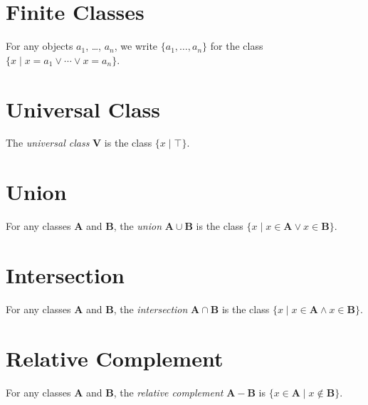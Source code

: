 \section{Finite Classes}

\begin{definition}
    For any objects $a_1$, \ldots, $a_n$, we write $\{ a_1, \ldots, a_n \}$
    for the class $\{ x \mid x = a_1 \vee \cdots \vee x = a_n \}$.
\end{definition}

\section{Universal Class}

\begin{definition}
    The \emph{universal class} $\mathbf{V}$ is the class $\{ x \mid \top \}$.
\end{definition}

\section{Union}

\begin{definition}[Union]
    For any classes $\mathbf{A}$ and $\mathbf{B}$, the \emph{union}
    $\mathbf{A} \cup \mathbf{B}$ is the class $\{ x \mid x \in \mathbf{A} \vee
    x \in \mathbf{B} \}$.
\end{definition}

\section{Intersection}

\begin{definition}[Intersection]
    For any classes $\mathbf{A}$ and $\mathbf{B}$, the \emph{intersection}
    $\mathbf{A} \cap \mathbf{B}$ is the class $\{ x \mid x \in \mathbf{A} \wedge
    x \in \mathbf{B} \}$.
\end{definition}

\section{Relative Complement}

\begin{definition}
    For any classes $\mathbf{A}$ and $\mathbf{B}$, the \emph{relative complement}
    $\mathbf{A} - \mathbf{B}$ is $\{ x \in \mathbf{A} \mid x \notin \mathbf{B} \}$.
\end{definition}

